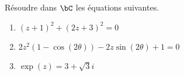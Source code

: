 
\begin{exercice}  \;
R\'esoudre dans $\bC$ les \'equations suivantes.
\begin{enumerate}
\item $(z+1)^2+(2z+3)^2=0$
\item $2z^2(1-\cos{(2\theta)})-2z\sin{(2\theta)}+1=0$
\item $\exp(z)=3+\sqrt{3}i$
\end{enumerate}
\end{exercice}